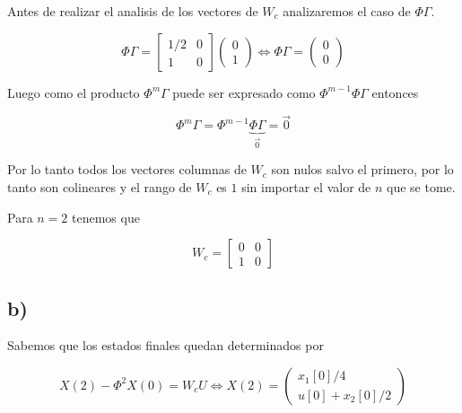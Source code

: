 \documentclass[11pt,a4paper]{article}
\begin{document}
    Antes de realizar el analisis de los vectores de $W_c$ analizaremos el caso de $\Phi\Gamma$.

    \begin{equation}
        \Phi \Gamma =
        \begin{bmatrix}
            1/2 & 0 \\ 
            1 & 0
        \end{bmatrix}
        \begin{pmatrix}
            0 \\ 1
        \end{pmatrix}
        \Leftrightarrow
        \Phi \Gamma = 
        \begin{pmatrix}
            0 \\ 0
        \end{pmatrix}
    \end{equation}

    Luego como el producto $\Phi^m \Gamma$ puede ser expresado como $\Phi^{m-1}\Phi\Gamma$ entonces 

    \begin{equation}
        \Phi^m\Gamma = \Phi^{m-1} \underbrace{\Phi\Gamma}_{ \vec{0} } = \vec{0}
    \end{equation}

    Por lo tanto todos los vectores columnas de $W_c$ son nulos salvo el primero, por lo tanto son 
    colineares y el rango de $W_c$ es $1$ sin importar el valor de $n$ que se tome.

    Para $n=2$ tenemos que 

    \begin{equation}
        W_c = 
        \begin{bmatrix}
            0 & 0 \\ 
            1 & 0
        \end{bmatrix}
    \end{equation}

    \subsection*{b)}

        Sabemos que los estados finales quedan determinados por 

        \begin{equation}
            X(2) - \Phi^2 X(0) = W_c U \Leftrightarrow
            X(2) = 
            \begin{pmatrix}
                x_1[0] / 4 \\ u[0] + x_2[0] /2
            \end{pmatrix}
        \end{equation}
\end{document}
